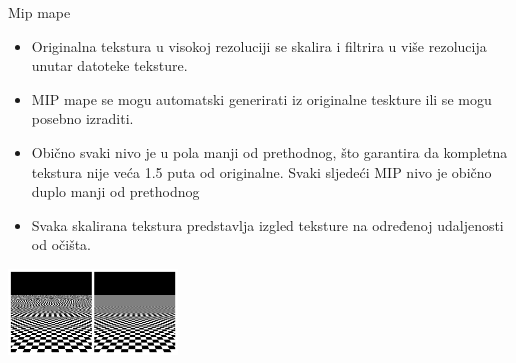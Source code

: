 \documentclass[9pt]{beamer}
\begin{document}
%
%
\begin{frame}{Mip mape}
	\begin{block}{}
		\begin{itemize}
			\item Originalna tekstura u visokoj rezoluciji se skalira i filtrira u više rezolucija unutar datoteke teksture. 
			\item MIP mape se mogu automatski generirati iz originalne teskture ili se mogu posebno izraditi.
			\item Obično svaki nivo je u pola manji od prethodnog, što garantira da kompletna tekstura nije veća 1.5 puta od originalne. Svaki sljedeći MIP nivo je obično duplo manji od prethodnog 
			\item Svaka skalirana tekstura predstavlja izgled teksture na određenoj udaljenosti od očišta. 
		\end{itemize}
	\end{block}
	\begin{center}
		\includegraphics[width=4.5cm]{slike/mipmap.png}
	\end{center}
\end{frame}
\end{document}
